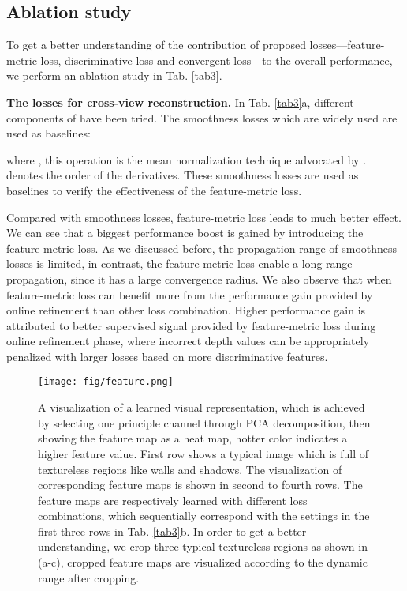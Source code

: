 \documentclass[runningheads]{llncs}
\begin{document}
\subsection{Ablation study}\label{sec43}
To get a better understanding of the contribution of proposed losses---feature-metric loss, discriminative loss and convergent loss---to the overall performance, we perform an ablation study in Tab. \ref{tab3}.

\textbf{The losses for cross-view reconstruction.}
In Tab. \ref{tab3}a, different components of  have been tried.
The smoothness losses which are widely used are used as baselines:

where , this operation is the mean normalization technique advocated by \cite{ddvo}.
 denotes the order of the derivatives.
These smoothness losses are used as baselines to verify the effectiveness of the feature-metric loss. 

Compared with smoothness losses, feature-metric loss leads to much better effect.
We can see that a biggest performance boost is gained by introducing the feature-metric loss.
As we discussed before, the propagation range of smoothness losses is limited, in contrast, the feature-metric loss enable a long-range propagation, since it has a large convergence radius.
We also observe that when feature-metric loss can benefit more from the performance gain provided by online refinement than other loss combination.
Higher performance gain is attributed to better supervised signal provided by feature-metric loss during online refinement phase, where incorrect depth values can be appropriately penalized with larger losses based on more discriminative features.

\begin{figure}[!t]
\centering
\texttt{[image: fig/feature.png]}
\caption{
A visualization of a learned visual representation, which is achieved by selecting one principle channel through PCA decomposition, then showing the feature map as a heat map, hotter color indicates a higher feature value.
First row shows a typical image which is full of textureless regions like walls and shadows.
The visualization of corresponding feature maps is shown in second to fourth rows.
The feature maps are respectively learned with different loss combinations, which sequentially correspond with the settings in the first three rows in Tab. \ref{tab3}b.
In order to get a better understanding, we crop three typical textureless regions as shown in (a-c), cropped feature maps are visualized according to the dynamic range after cropping.
}
\label{feature}
\end{figure}
\end{document}
